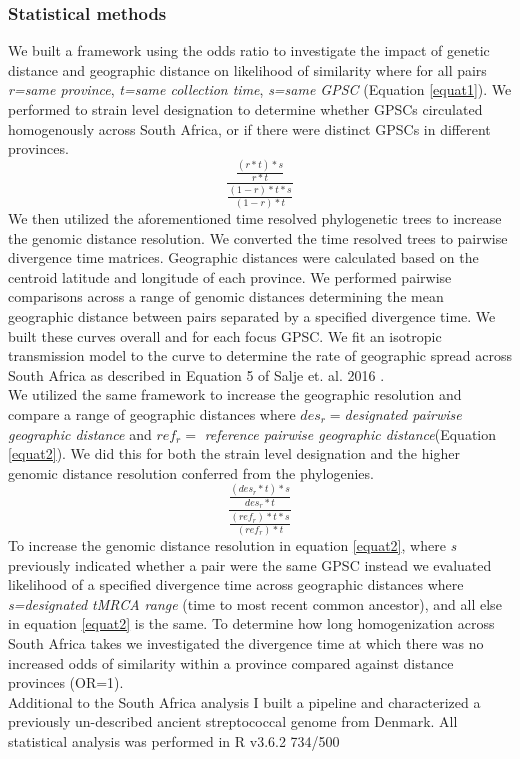 \documentclass{article}
\begin{document}
\subsubsection{Statistical methods}
We built a framework using the odds ratio to investigate the impact of genetic distance and geographic distance on likelihood of similarity where for all pairs \textit{r=same province}, \textit{t=same collection time}, \textit{s=same GPSC} (Equation \ref{equat1}). We performed to strain level designation to determine whether GPSCs circulated homogenously across South Africa, or if there were distinct GPSCs in different provinces. 
\begin{equation}
\frac{\frac{(r*t)*s}{r*t}}{\frac{(1-r)*t*s}{(1-r)*t}}
\label{equat1}
\end{equation}
We then utilized the aforementioned time resolved phylogenetic trees to increase the genomic distance resolution. We converted the time resolved trees to pairwise divergence time matrices. Geographic distances were calculated based on the centroid latitude and longitude of each province. We performed pairwise comparisons across a range of genomic distances determining the mean geographic distance between pairs separated by a specified divergence time. We built these curves overall and for each focus GPSC. We fit an isotropic transmission model to the curve to determine the rate of geographic spread across South Africa as described in Equation 5 of Salje et. al. 2016 \cite{saljeEstimatingInfectiousDisease2016}. \\We utilized the same framework to increase the geographic resolution and compare a range of geographic distances where $des_r=$\textit{designated pairwise geographic distance} and  $ref_r=$ \textit{reference pairwise geographic distance}(Equation \ref{equat2}). We did this for both the strain level designation and the higher genomic distance resolution conferred from the phylogenies.
\begin{equation}
\frac{\frac{(des_r*t)*s}{des_r*t}}{\frac{(ref_r)*t*s}{(ref_r)*t}} 
\label{equat2}
\end{equation}
To increase the genomic distance resolution in equation \ref{equat2}, where \textit{s} previously indicated whether a pair were the same GPSC instead we evaluated likelihood of a specified divergence time across geographic distances where \textit{s=designated tMRCA range} (time to most recent common ancestor), and all else in equation \ref{equat2} is the same. To determine how long homogenization across South Africa takes we investigated the divergence time at which there was no increased odds of similarity within a province compared against distance provinces (OR=1). \\
Additional to the South Africa analysis I built a pipeline and characterized a previously un-described ancient streptococcal genome from Denmark. 
All statistical analysis was performed in R v3.6.2
734/500
\end{document}
